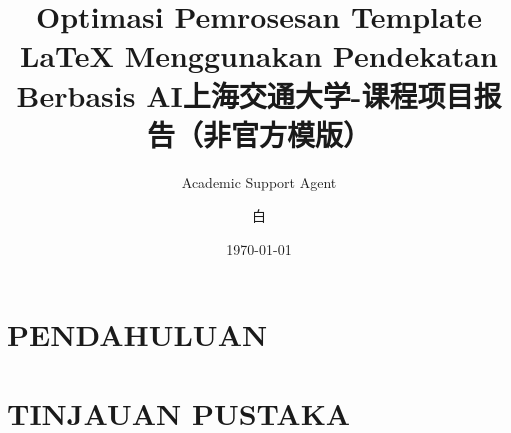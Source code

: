 \documentclass{ctexart}
\title{Optimasi Pemrosesan Template LaTeX Menggunakan Pendekatan Berbasis AI}
\author{Academic Support Agent}
\date{\today}
\begin{document}
\maketitle

\begin{abstract}

\end{abstract}

\chapter{PENDAHULUAN}


\chapter{TINJAUAN PUSTAKA}


\usepackage{array}
\usepackage{amsmath}
\usepackage{amssymb}
\usepackage{array}
\usepackage[backend=biber,style=gb7714-2015]{biblatex}
\usepackage{fancyhdr}
\usepackage[margin=1in]{geometry}
\usepackage{graphicx}
\usepackage[hidelinks]{hyperref}
\usepackage{listings}
\usepackage{minted}
\usepackage{tabularx}
\usepackage{url}
\usepackage[dvipsnames]{xcolor}

\pagestyle{fancy}
\fancyfoot[C]{\thepage}
\renewcommand{\headrulewidth}{1pt}

\linespread{1.25}

\setmainfont{Times New Roman}
\newcommand{\fallback}{\CJKfamily{Babel}}


\hypersetup{
  colorlinks = true,
  urlcolor = CadetBlue,
  linkcolor = Cerulean,
  citecolor = Maroon
}




\title{\textbf{上海交通大学-课程项目报告（非官方模版）}}
\author{白\fallback{鹡鸰}}
\date{}
\end{document}
